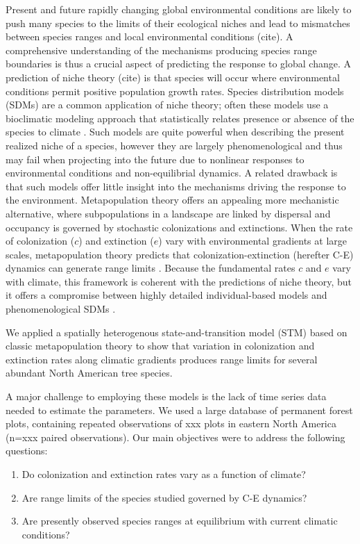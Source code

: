 \documentclass[11pt]{article}
\begin{document}
Present and future rapidly changing global environmental conditions are likely to push many species to the limits of their ecological niches and lead to mismatches between species ranges and local environmental conditions (cite).
A comprehensive understanding of the mechanisms producing species range boundaries is thus a crucial aspect of predicting the response to global change.
A prediction of niche theory (cite) is that species will occur where environmental conditions permit positive population growth rates.
Species distribution models (SDMs) are a common application of niche theory; often these models use a bioclimatic modeling approach that statistically relates presence or absence of the species to climate \cite{Guisan2005}.
Such models are quite powerful when describing the present realized niche of a species, however they are largely phenomenological and thus may fail when projecting into the future due to nonlinear responses to environmental conditions and non-equilibrial dynamics.
A related drawback is that such models offer little insight into the mechanisms driving the response to the environment.
Metapopulation theory \cite{Levins1969} offers an appealing more mechanistic alternative, where subpopulations in a landscape are linked by dispersal and occupancy is governed by stochastic colonizations and extinctions.
When the rate of colonization ($c$) and extinction ($e$) vary with environmental gradients at large scales, metapopulation theory predicts that colonization-extinction (herefter C-E) dynamics can generate range limits \cite{Holt2000, Holt2005}.
Because the fundamental rates $c$ and $e$ vary with climate, this framework is coherent with the predictions of niche theory, but it offers a compromise between highly detailed individual-based models and phenomenological SDMs \cite{Harrison2011, Yackulic2015}.

We applied a spatially heterogenous state-and-transition model (STM) based on classic metapopulation theory \cite{Levins1969, Holt2000} to show that variation in colonization and extinction rates along climatic gradients produces range limits for several abundant North American tree species.


A major challenge to employing these models is the lack of time series data needed to estimate the parameters.
We used a large database of permanent forest plots, containing repeated observations of xxx plots in eastern North America (n=xxx paired observations). 
Our main objectives were to address the following questions:
\begin{enumerate}
	\item Do colonization and extinction rates vary as a function of climate?
	\item Are range limits of the species studied governed by C-E dynamics?
	\item Are presently observed species ranges at equilibrium with current climatic conditions?
\end{enumerate}
\end{document}
